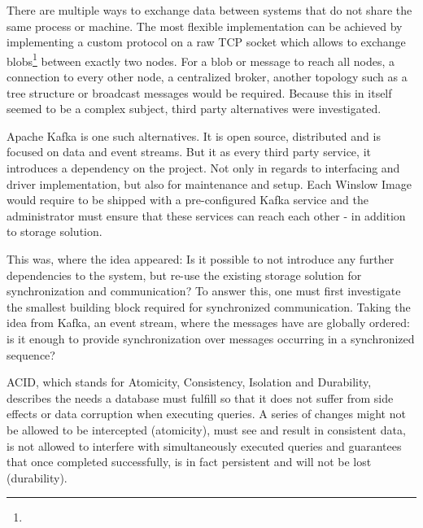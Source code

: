There are multiple ways to exchange data between systems that do not share the same process or machine.
The most flexible implementation can be achieved by implementing a custom protocol on a raw TCP socket which allows to exchange blobs\footnote{} between exactly two nodes.
For a blob or message to reach all nodes, a connection to every other node, a centralized broker, another topology such as a tree structure or broadcast messages would be required.
Because this in itself seemed to be a complex subject, third party alternatives were investigated.

Apache Kafka  is one such alternatives.
It is open source, distributed and is focused on data and event streams.
But it as every third party service, it introduces a dependency on the project.
Not only in regards to interfacing and driver implementation, but also for maintenance and setup.
Each Winslow Image would require to be shipped with a pre-configured Kafka service and the administrator must ensure that these services can reach each other - in addition to storage solution.

This was, where the idea appeared: Is it possible to not introduce any further dependencies to the system, but re-use the existing storage solution for synchronization and communication?
To answer this, one must first investigate the smallest building block required for synchronized communication.
Taking the idea from Kafka, an event stream, where the messages have are globally ordered: is it enough to provide synchronization over messages occurring in a synchronized sequence?

ACID, which stands for Atomicity, Consistency, Isolation and Durability, describes the needs a database must fulfill so that it does not suffer from side effects or data corruption when executing queries.
A series of changes might not be allowed to be intercepted (atomicity), must see and result in consistent data, is not allowed to interfere with simultaneously executed queries and guarantees that once completed successfully, is in fact persistent and will not be lost (durability).






